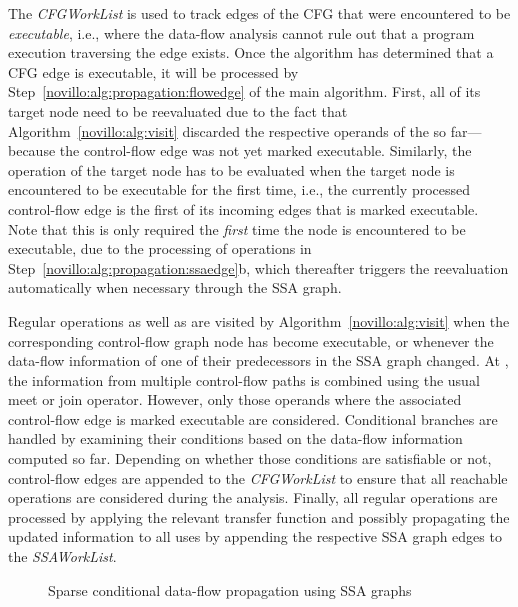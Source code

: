 The \emph{CFGWorkList} is used to track edges of the CFG that were encountered to be \emph{executable}, i.e., where the data-flow analysis cannot rule out that a program execution traversing the edge exists. 
Once the algorithm has determined that a CFG edge is executable, it will be processed by Step~\ref{novillo:alg:propagation:flowedge} of the main algorithm. 
First, all \phifuns of its target node need to be reevaluated due to the fact that Algorithm~\ref{novillo:alg:visit} discarded the respective operands of the \phifuns so far---because the control-flow edge was not yet marked executable. 
Similarly, the operation of the target node has to be evaluated when the target node is encountered to be executable for the first time, i.e., the currently processed control-flow edge is the first of its incoming edges that is marked executable. 
Note that this is only required the \emph{first} time the node is encountered to be executable, due to the processing of operations in Step~\ref{novillo:alg:propagation:ssaedge}b, which thereafter triggers the reevaluation automatically when necessary through the SSA graph.

Regular operations as well as \phifuns are visited by Algorithm~\ref{novillo:alg:visit} when the corresponding control-flow graph node has become executable, or whenever the data-flow information of one of their predecessors in the SSA graph changed. 
At \phifuns, the information from multiple control-flow paths is combined using the usual meet or join operator. 
However, only those operands where the associated control-flow edge is marked executable are considered. 
Conditional branches are handled by examining their conditions based on the data-flow information computed so far. 
Depending on whether those conditions are satisfiable or not, control-flow edges are appended to the \emph{CFGWorkList} to ensure that all reachable operations are considered during the analysis. 
Finally, all regular operations are processed by applying the relevant transfer function and possibly propagating the updated information to all uses by appending the respective SSA graph edges to the \emph{SSAWorkList}.

\begin{figure}[t]
  \caption{Sparse conditional data-flow propagation using SSA graphs}
  \label{fig:constant_propagation_is_easier:ssa_propagation}
\end{figure}

